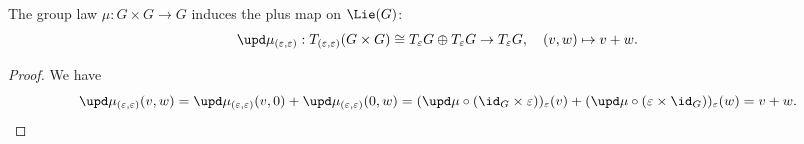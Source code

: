     \begin{proposition}\label{prop:multiplication_of_group_induces_plus_on_Lie_algebra}
        The group law \(\mu: G \times G \to G\) induces the plus map on \(\Lie(G)\):
        \[
            \upd\mu_{(\varepsilon,\varepsilon)}: T_{(\varepsilon,\varepsilon)}(G \times G) \cong T_\varepsilon G \oplus T_\varepsilon G \to T_\varepsilon G, \quad (v,w) \mapsto v + w.
        \]
    \end{proposition}
    \begin{proof}
        We have 
        \[ \upd \mu_{(\varepsilon,\varepsilon)}(v,w) = \upd \mu_{(\varepsilon,\varepsilon)}(v,0) + \upd \mu_{(\varepsilon,\varepsilon)}(0,w) = (\upd \mu \circ (\id_G \times \varepsilon))_\varepsilon(v) + (\upd \mu \circ (\varepsilon \times \id_G))_\varepsilon(w) = v + w. \]
    \end{proof}